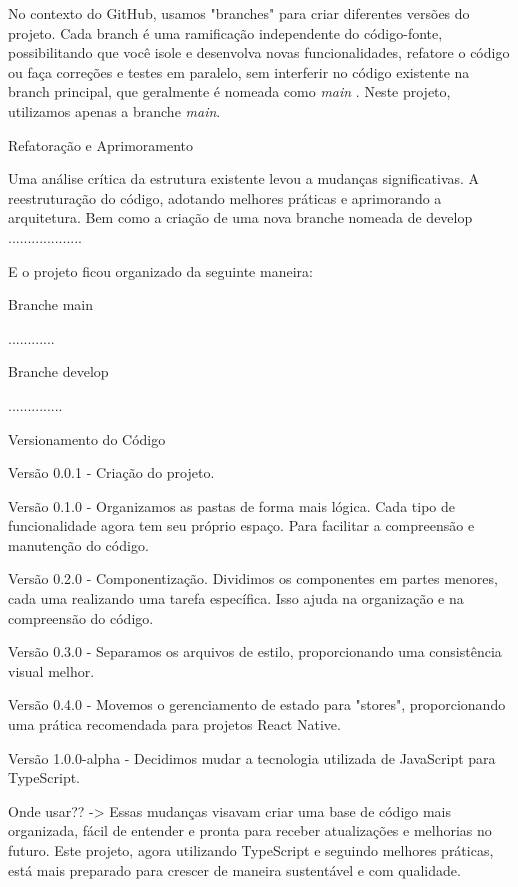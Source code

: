 No contexto do GitHub, usamos "branches" para criar diferentes versões do projeto. Cada branch é uma ramificação independente do código-fonte, possibilitando que você isole e desenvolva novas funcionalidades, refatore o código ou faça correções e testes em paralelo, sem interferir no código existente na branch principal, que geralmente é nomeada como \textit{main} \cite{al}. Neste projeto, utilizamos apenas a branche \textit{main}.


Refatoração e Aprimoramento

Uma análise crítica da estrutura existente levou a mudanças significativas. A reestruturação do código, adotando melhores práticas e aprimorando a arquitetura. Bem como a criação de uma nova branche nomeada de develop ...................

E o projeto ficou organizado da seguinte maneira: 

Branche main

............

Branche develop

..............

Versionamento do Código

Versão 0.0.1 -  Criação do projeto.

Versão 0.1.0 - Organizamos as pastas de forma mais lógica. Cada tipo de funcionalidade agora tem seu próprio espaço. Para facilitar a compreensão e manutenção do código.

Versão 0.2.0 - Componentização. Dividimos os componentes em partes menores, cada uma realizando uma tarefa específica. Isso ajuda na organização e na compreensão do código.

Versão 0.3.0 - Separamos os arquivos de estilo, proporcionando uma consistência visual melhor.

Versão 0.4.0 - Movemos o gerenciamento de estado para "stores", proporcionando uma prática recomendada para projetos React Native.

Versão 1.0.0-alpha - Decidimos mudar a tecnologia utilizada de JavaScript para TypeScript.


Onde usar??  ->  Essas mudanças visavam criar uma base de código mais organizada, fácil de entender e pronta para receber atualizações e melhorias no futuro. Este projeto, agora utilizando TypeScript e seguindo melhores práticas, está mais preparado para crescer de maneira sustentável e com qualidade.


        
